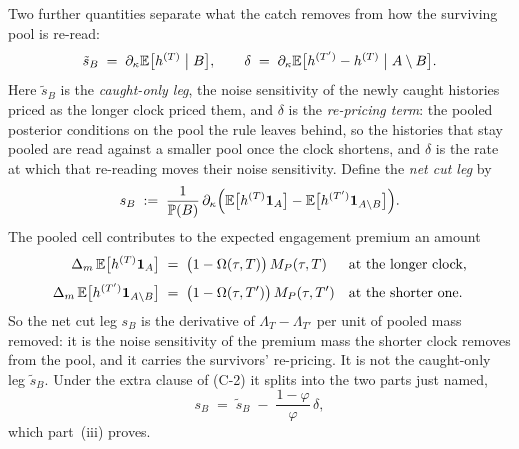 Two further quantities separate what the catch removes from how the surviving pool is re-read:
\begin{equation}
\label{eq:caught-raw}
\tilde s_B \;=\; \partial_\kappa\mathbb{E}\bigl[h^{(T)} \bigm| B\bigr],
\qquad
\delta \;=\; \partial_\kappa\mathbb{E}\bigl[h^{(T')} - h^{(T)} \bigm| A\setminus B\bigr] .
\end{equation}
Here $\tilde s_B$ is the \emph{caught-only leg}, the noise sensitivity of the newly caught
histories priced as the longer clock priced them, and $\delta$ is the \emph{re-pricing term}: the pooled posterior conditions
on the pool the rule leaves behind, so the histories that stay pooled are read against a smaller
pool once the clock shortens, and $\delta$ is the rate at which that re-reading moves their noise
sensitivity. Define the \emph{net cut leg} by
\begin{equation}
\label{eq:caught-sB}
s_B \;:=\; \frac{1}{\mathbb{P}(B)}\,
\partial_\kappa\Bigl(
\mathbb{E}\bigl[h^{(T)}\mathbf{1}_A\bigr] - \mathbb{E}\bigl[h^{(T')}\mathbf{1}_{A\setminus B}\bigr]
\Bigr) .
\end{equation}
The pooled cell contributes to the expected engagement premium an amount
\[
\begin{aligned}
\Delta_m\,\mathbb{E}\bigl[h^{(T)}\mathbf{1}_A\bigr]
  \;&=\; \bigl(1-\Omega(\tau,T)\bigr)\,M_P(\tau,T)
  &&\text{at the longer clock,} \\[3pt]
\Delta_m\,\mathbb{E}\bigl[h^{(T')}\mathbf{1}_{A\setminus B}\bigr]
  \;&=\; \bigl(1-\Omega(\tau,T')\bigr)\,M_P(\tau,T')
  &&\text{at the shorter one.}
\end{aligned}
\]
So the net cut leg $s_B$ is the derivative of $\Lambda_T - \Lambda_{T'}$ per unit of pooled mass removed: it is
the noise sensitivity of the premium mass the shorter clock removes from the pool, and it
carries the survivors' re-pricing. It is not the caught-only leg $\tilde s_B$. Under the extra clause of (C-2) it
splits into the two parts just named,
\begin{equation}
\label{eq:caught-split}
s_B \;=\; \tilde s_B \;-\; \frac{1-\varphi}{\varphi}\,\delta ,
\end{equation}
which part~(iii) proves.

